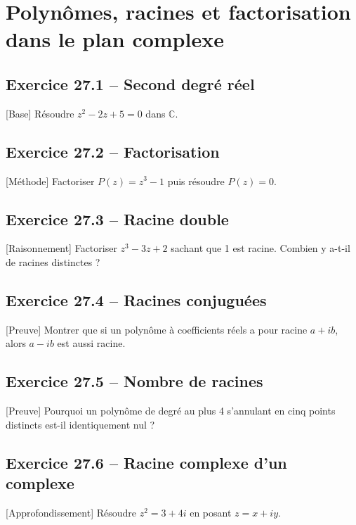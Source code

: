 \chapter{Polynômes, racines et factorisation dans le plan complexe}
\section*{Exercice 27.1 -- Second degré réel}
[Base] Résoudre $z^2-2z+5=0$ dans $\mathbb C$.

\section*{Exercice 27.2 -- Factorisation}
[Méthode] Factoriser $P(z)=z^3-1$ puis résoudre $P(z)=0$.

\section*{Exercice 27.3 -- Racine double}
[Raisonnement] Factoriser $z^3-3z+2$ sachant que 1 est racine. Combien y a-t-il de racines distinctes ?

\section*{Exercice 27.4 -- Racines conjuguées}
[Preuve] Montrer que si un polynôme à coefficients réels a pour racine $a+i b$, alors $a-i b$ est aussi racine.

\section*{Exercice 27.5 -- Nombre de racines}
[Preuve] Pourquoi un polynôme de degré au plus 4 s'annulant en cinq points distincts est-il identiquement nul ?

\section*{Exercice 27.6 -- Racine complexe d’un complexe}
[Approfondissement] Résoudre $z^2=3+4i$ en posant $z=x+i y$.
